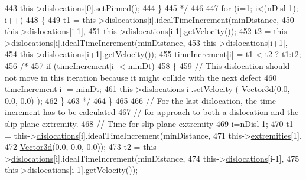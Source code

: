 \begin{DoxyCode}
443 \textcolor{comment}{    this->dislocations[0].setPinned();}
444 \textcolor{comment}{    \}}
445 \textcolor{comment}{  */}
446 
447   \textcolor{keywordflow}{for} (i=1; i<(nDisl-1); i++)
448     \{
449       t1 = this->\hyperlink{classSlipPlane_ad92c7c409f7e161db449528389180910}{dislocations}[i].idealTimeIncrement(minDistance,
450                                                     this->\hyperlink{classSlipPlane_ad92c7c409f7e161db449528389180910}{dislocations}[i-1],
451                                                     this->\hyperlink{classSlipPlane_ad92c7c409f7e161db449528389180910}{dislocations}[i-1].getVelocity());
452       t2 = this->\hyperlink{classSlipPlane_ad92c7c409f7e161db449528389180910}{dislocations}[i].idealTimeIncrement(minDistance,
453                                                     this->\hyperlink{classSlipPlane_ad92c7c409f7e161db449528389180910}{dislocations}[i+1],
454                                                     this->\hyperlink{classSlipPlane_ad92c7c409f7e161db449528389180910}{dislocations}[i+1].getVelocity());
455       timeIncrement[i] = t1 < t2 ? t1:t2;
456       \textcolor{comment}{/*}
457 \textcolor{comment}{        if (timeIncrement[i] < minDt)}
458 \textcolor{comment}{        \{}
459 \textcolor{comment}{        // This dislocation should not move in this iteration because it might collide with the next defect}
460 \textcolor{comment}{        timeIncrement[i] = minDt;}
461 \textcolor{comment}{        this->dislocations[i].setVelocity ( Vector3d(0.0, 0.0, 0.0) );}
462 \textcolor{comment}{        \}}
463 \textcolor{comment}{      */}
464     \}
465 
466   \textcolor{comment}{// For the last dislocation, the time increment has to be calculated}
467   \textcolor{comment}{// for approach to both a dislocation and the slip plane extremity.}
468   \textcolor{comment}{// Time for slip plane extremity}
469   i=nDisl-1;
470   t1 = this->\hyperlink{classSlipPlane_ad92c7c409f7e161db449528389180910}{dislocations}[i].idealTimeIncrement(minDistance,
471                                                 this->\hyperlink{classSlipPlane_abbdbe6ed805faf3777b54ff55a9c089c}{extremities}[1],
472                                                 \hyperlink{classVector3d}{Vector3d}(0.0, 0.0, 0.0));
473   t2 = this->\hyperlink{classSlipPlane_ad92c7c409f7e161db449528389180910}{dislocations}[i].idealTimeIncrement(minDistance,
474                                                 this->\hyperlink{classSlipPlane_ad92c7c409f7e161db449528389180910}{dislocations}[i-1],
475                                                 this->\hyperlink{classSlipPlane_ad92c7c409f7e161db449528389180910}{dislocations}[i-1].getVelocity());

\end{DoxyCode}

